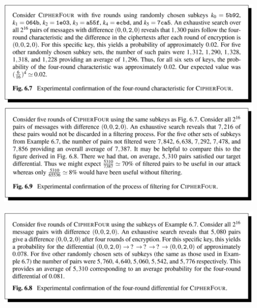 \documentclass[10pt, a4paper]{article}
\begin{document}
\begin{Problem}
\begin{itemize}
\begin{center}
    \includegraphics[width=15.2cm]{./images/q5_1.png}    
    \includegraphics[width=15.2cm]{./images/q5_2.png}    
    \pagebreak
\end{center}
\begin{center}
    \includegraphics[width=15.2cm]{./images/q5_3.png}    
\end{center}

\end{itemize}
\end{Problem}
\end{document}
